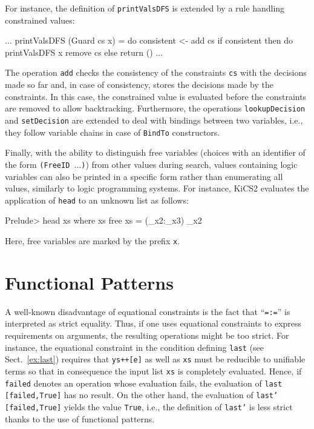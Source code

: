\documentclass{llncs}
\newcommand{\code}[1]{\mbox{\small\texttt{#1}}}
\newcommand{\ccode}[1]{``\code{#1}''}
\newcommand{\us}{\char95\xspace} %
\begin{document}
For instance, the definition of \code{printValsDFS} is extended by
a rule handling constrained values:
%
\begin{haskell}
  $\ldots$
  printValsDFS (Guard cs x) = do consistent <- add cs
                                 if consistent then do printValsDFS x
                                                       remove cs
                                               else return ()
  $\ldots$
\end{haskell}
The operation \code{add} checks the consistency of the constraints \code{cs}
with the decisions made so far and, in case of consistency,
stores the decisions made by the constraints.
In this case, the constrained value is evaluated
before the constraints are removed to allow backtracking.
Furthermore, the operations \code{lookupDecision} and \code{setDecision}
are extended to deal with bindings between two variables,
i.e., they follow variable chains in case of \code{BindTo} constructors.

Finally, with the ability to distinguish free variables 
(choices with an identifier of the form \code{(FreeID $\ldots$)})
from other values during search, values containing logic variables 
can also be printed in a specific form rather than enumerating all values, 
similarly to logic programming systems. For instance, KiCS2 evaluates the 
application of \code{head} to an unknown list as follows:
\begin{haskell}
  Prelude> head xs where xs free
  {xs = (_x2:_x3)} _x2
\end{haskell}
Here, free variables are marked by the prefix \code{\us{}x}.


\section{Functional Patterns}
\label{sec:FuncPatterns}

A well-known disadvantage of equational constraints
is the fact that \ccode{=:=} is interpreted as strict equality.
Thus, if one uses equational constraints to express
requirements on arguments, the resulting operations might be too strict.
For instance, the equational constraint in the condition
defining \code{last} (see Sect.~\ref{ex:last})
requires that \code{ys++[e]} as well as \code{xs}
must be reducible to unifiable terms so that in consequence
the input list \code{xs} is completely evaluated.
Hence, if \code{failed} denotes an operation whose evaluation fails,
the evaluation of \code{last [failed,True]} has no result.
On the other hand, the evaluation of \code{last' [failed,True]} yields
the value \code{True}, i.e., the definition of \code{last'} is less strict
thanks to the use of functional patterns.
\end{document}
